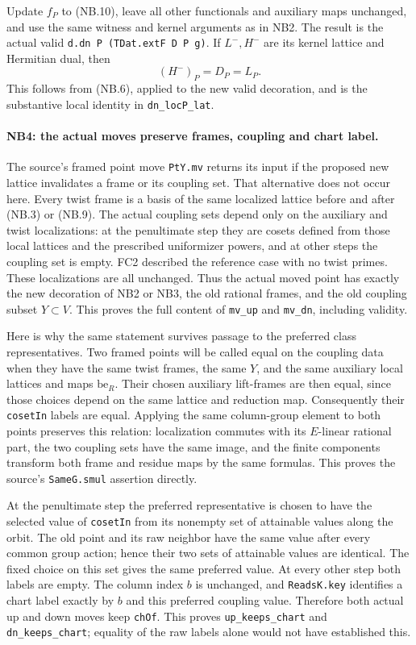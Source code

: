 \documentclass[11pt,a4paper]{article}
\numberwithin{equation}{section}
\theoremstyle{remark}\newtheorem{remark}[theorem]{Remark}
\begin{document}
Update $f_P$ to (NB.10), leave all other functionals and auxiliary maps
unchanged, and use the same witness and kernel arguments as in NB2.
The result is the actual valid \texttt{d.dn P (TDat.extF D P g)}.
If $L^-,H^-$ are its kernel lattice and Hermitian dual, then
\[
                         (H^-)_P=D_P=L_P.           \tag{NB.11}
\]
This follows from (NB.6), applied to the new valid decoration, and is
the substantive local identity in \texttt{dn\_\allowbreak locP\_\allowbreak lat}.

\paragraph{NB4: the actual moves preserve frames, coupling and chart label.}
The source's framed point move \texttt{PtY.mv} returns its input if the
proposed new lattice invalidates a frame or its coupling set. That
alternative does not occur here. Every twist frame is a basis of the
same localized lattice before and after (NB.3) or (NB.9). The actual
coupling sets depend only on the auxiliary and twist localizations:
at the penultimate step they are cosets defined from those local
lattices and the prescribed uniformizer powers, and at other steps
the coupling set is empty. FC2 described the reference case with no
twist primes. These localizations are all
unchanged. Thus the actual moved point has exactly the new decoration
of NB2 or NB3, the old rational frames, and the old coupling subset
$Y\subset V$. This proves the full content of \texttt{mv\_\allowbreak up} and
\texttt{mv\_\allowbreak dn}, including validity.

Here is why the same statement survives passage to the preferred
class representatives. Two framed points will be called equal on
the coupling data when they have the same twist frames, the same
$Y$, and the same auxiliary local lattices and maps
$\mathrm{be}_R$. Their chosen auxiliary lift-frames are then equal,
since those choices depend on the same lattice and reduction map.
Consequently their \texttt{cosetIn} labels are equal. Applying the
same column-group element to both points preserves this relation:
localization commutes with its $E$-linear rational part, the two
coupling sets have the same image, and the finite components transform
both frame and residue maps by the same formulas. This proves the
source's \texttt{SameG.smul} assertion directly.

At the penultimate step the preferred representative is chosen to
have the selected value of \texttt{cosetIn} from its nonempty set of
attainable values along the orbit. The old point and its raw neighbor
have the same value after every common group action; hence their two
sets of attainable values are identical. The fixed choice on this
set gives the same preferred value. At every other step both labels
are empty. The column index $b$ is unchanged, and \texttt{ReadsK.key}
identifies a chart label exactly by $b$ and this preferred coupling
value. Therefore both actual up and down moves keep \texttt{chOf}.
This proves \texttt{up\_\allowbreak keeps\_\allowbreak chart} and \texttt{dn\_\allowbreak keeps\_\allowbreak chart};
equality of the raw labels alone would not have established this.
\end{document}
